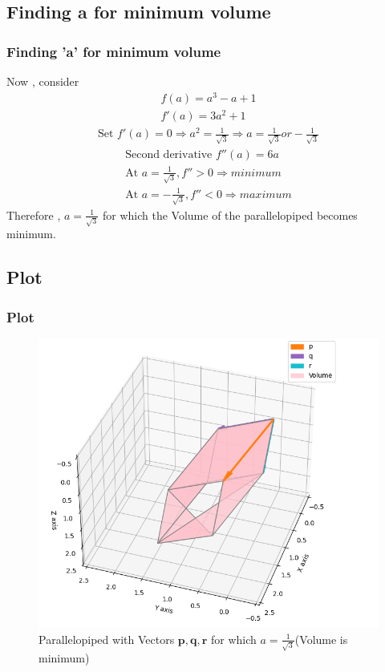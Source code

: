 \documentclass{beamer}
\theoremstyle{remark}
\let\vec\mathbf
\numberwithin{equation}{section}
\begin{document}
\subsection{Finding a for minimum volume}
\begin{frame}[fragile]
\frametitle{Finding 'a' for minimum volume}
    Now , consider
\begin{align}
    f(a)=a^3-a+1\\
    f'(a)=3a^2+1
\end{align}
\begin{align*}
\text{Set }f'(a)=0  \Rightarrow a^2=\frac{1}{\sqrt{3}} \Rightarrow a=\frac{1}{\sqrt{3}} or -\frac{1}{\sqrt{3}} 
\end{align*}
\begin{align}
\text{Second derivative }f''(a)=6a\\
\text{At }a=\frac{1}{\sqrt{3}},f''>0 \Rightarrow minimum\\
\text{At }a=-\frac{1}{\sqrt{3}},f''<0 \Rightarrow maximum
\end{align}
Therefore , $a=\frac{1}{\sqrt{3}}$ for which the Volume of the parallelopiped becomes minimum.
\end{frame}
\subsection{Plot}
\begin{frame}[fragile]
\frametitle{Plot}

\begin{figure}[h!]
   \centering
   \includegraphics[width=0.7\columnwidth]{figs/fig.png}
	\caption*{Parallelopiped with Vectors $\vec{p},\vec{q},\vec{r}$ for which $a=\frac{1}{\sqrt{3}}$(Volume is minimum)}
   \label{}
\end{figure}
\end{frame}
\end{document}
